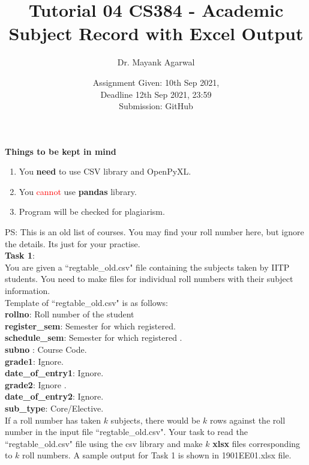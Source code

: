 \documentclass[12pt,  letterpaper,  twoside]{article}
\title{Tutorial 04 CS384 -  Academic Subject Record with Excel Output}
\author{Dr. Mayank Agarwal}
\date{Assignment Given: 10th Sep 2021,\\ Deadline 12th Sep 2021,  
23:59\\Submission: GitHub }
\begin{document}
	\maketitle  
	\textbf{Things to be kept in mind}\\
	\begin{enumerate}
		\item You \textbf{need } to use CSV library and OpenPyXL.   
				\item You \textcolor{red}{cannot }use \textbf{pandas} 
				library.   
		\item Program will be checked for plagiarism.  
	\end{enumerate}
	
PS: This is an old list of courses. You may find your roll number here, but 
ignore the details. Its  just for your practise. \\

\textbf{Task 1}:\\ You are given a ``regtable\_old.csv" file containing the 
subjects taken by IITP students. You need to make files for individual roll 
numbers with their subject information.\\

\noindent Template of ``regtable\_old.csv" is as follows:\\
\noindent \textbf{rollno}: Roll number of the student \\
	\textbf{register\_sem}: Semester for which registered. \\	
		\textbf{schedule\_sem}: Semester for which registered	. \\
		\textbf{subno}	: Course Code. \\
		\textbf{grade1}: Ignore. \\
			\textbf{date\_of\_entry1}: Ignore. \\
				\textbf{grade2}: Ignore	. \\
	\textbf{date\_of\_entry2}: Ignore. \\
		\textbf{sub\_type}: Core/Elective. \\


If a roll number has taken $ k $ subjects, there would be $ k $ rows against 
the roll number in the input file   ``regtable\_old.csv". Your task to read 
the  
``regtable\_old.csv" file using the csv library and make $ k $ \textbf{xlsx} 
files 
corresponding to $ k $ roll numbers. A sample output for Task 1 is shown in 
1901EE01.xlsx  file. \\
\end{document}
